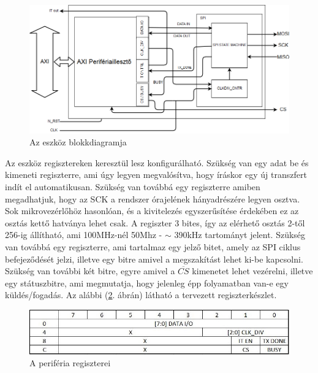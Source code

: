\documentclass[a4paper,11pt]{article}
\begin{document}
\begin{figure}[H]
	\begin{center}
	\includegraphics[scale=0.5]{system_blockdesign.png}	
	\end{center}
	\caption{Az eszköz blokkdiagramja}
	\label{fig:system_main}
\end{figure}

Az eszköz regisztereken keresztül lesz konfigurálható. Szükség van egy adat be és kimeneti regiszterre, ami úgy legyen megvalósítva, hogy íráskor egy új transzfert indít el automatikusan. Szükség van továbbá egy regiszterre amiben megadhatjuk, hogy az SCK a rendszer órajelének hányadrészére legyen osztva. Sok mikrovezérlőhöz hasonlóan, és a kivitelezés egyszerűsítése érdekében ez az osztás kettő hatványa lehet csak. A regiszter 3 bites, így az elérhető osztás 2-től 256-ig állítható, ami 100MHz-nél 50Mhz - $\sim$ 390kHz tartományt jelent. Szükség van továbbá egy regiszterre, ami tartalmaz egy jelző bitet, amely az SPI ciklus befejeződését jelzi, illetve egy bitre amivel a megszakítást lehet ki-be kapcsolni. Szükség van további két bitre, egyre amivel a $\overline{CS}$ kimenetet lehet vezérelni, illetve egy státuszbitre, ami megmutatja, hogy jelenleg épp folyamatban van-e egy küldés/fogadás. Az alábbi (\ref{fig:registers}. ábrán) látható a tervezett regiszterkészlet.

\begin{figure}[H]
	\begin{center}
	\includegraphics[scale=1]{reg_set.JPG}	
	\end{center}
	\caption{A periféria regiszterei}
	\label{fig:registers}
\end{figure}
\end{document}
